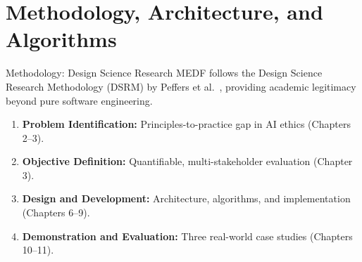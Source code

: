 \section{Methodology, Architecture, and Algorithms}

\begin{frame}{Methodology: Design Science Research}
    MEDF follows the Design Science Research Methodology (DSRM) by Peffers et al.~\cite{peffers2007dsrm}, providing academic legitimacy beyond pure software engineering.

    \vspace{8pt}
    \begin{enumerate}
        \item \textbf{Problem Identification:} Principles-to-practice gap in AI ethics (Chapters 2--3).
        \item \textbf{Objective Definition:} Quantifiable, multi-stakeholder evaluation (Chapter 3).
        \item \textbf{Design and Development:} Architecture, algorithms, and implementation (Chapters 6--9).
        \item \textbf{Demonstration and Evaluation:} Three real-world case studies (Chapters 10--11).
    \end{enumerate}
\end{frame}

